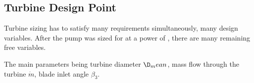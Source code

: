 \subsection{Turbine Design Point}

Turbine sizing has to satisfy many requirements simultaneously, many design variables. After the pump was sized for \valPumpRpmDesign at a power of \valTurbPowerDesign, there are many remaining free variables.

The main parameters being turbine diameter $\D_mean$, mass flow through the turbine $\dot{m}$, blade inlet angle $\beta_3$.

